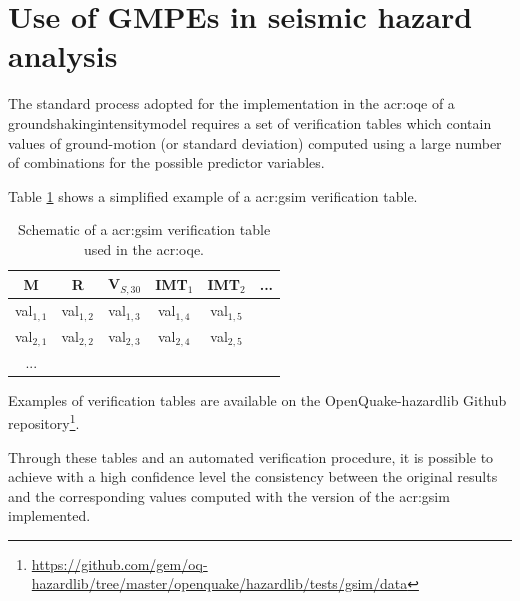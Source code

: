 %
\section{Use of GMPEs in seismic hazard analysis}
% 
The standard process adopted for the implementation in the \gls{acr:oqe} 
of a \gls{groundshakingintensitymodel} requires a 
set of verification tables which contain values of ground-motion (or standard 
deviation) computed using a large number of combinations for the possible 
predictor variables. 

Table \ref{tab:verification} shows a simplified example of a \gls{acr:gsim} 
verification table.
\begin{table}[!hb]
\centering
\begin{tabular}{|cccccc|}
\hline
\rowcolor{anti-flashwhite}
M & R & V$_{S,30}$ & IMT$_1$ & IMT$_2$ & ... \\
\hline 
val$_{1,1}$ & val$_{1,2}$ & val$_{1,3}$ & val$_{1,4}$ & val$_{1,5}$ & \\
val$_{2,1}$ & val$_{2,2}$ & val$_{2,3}$ & val$_{2,4}$ & val$_{2,5}$ & \\
... & & & & & \\
\hline
\end{tabular}
\caption{Schematic of a \gls{acr:gsim} verification table used in the 
\gls{acr:oqe}.}
\label{tab:verification}
\end{table}
Examples of verification tables are available on the OpenQuake-hazardlib Github
repository\footnote{
\href{https://github.com/gem/oq-hazardlib/tree/master/openquake/hazardlib/tests/gsim/data}{
https://github.com/gem/oq-hazardlib/tree/master/openquake/hazardlib/tests/gsim/data}
}.

Through these tables and an automated verification procedure, it is 
possible to achieve with a high confidence level the consistency between 
the original results and the corresponding values computed with the 
version of the \gls{acr:gsim} implemented.
%
% 
